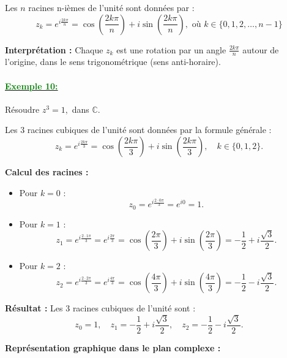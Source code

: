 \documentclass[12pt,a4paper]{article}
\begin{document}
Les \(n\) racines n-ièmes de l’unité sont données par :
\[
z_k = e^{i\frac{2k\pi}{n}} = \cos\left(\frac{2k\pi}{n}\right) + i\sin\left(\frac{2k\pi}{n}\right), \text{ où } k \in \{0, 1, 2, \ldots, n-1\}
\]

\textbf{Interprétation :} Chaque \(z_k\) est une rotation par un angle \(\frac{2k\pi}{n}\) autour de l’origine, dans le sens trigonométrique (sens anti-horaire). 

\paragraph{\underline{\textbf{\textcolor{green}{Exemple 10: }}}}

Résoudre \( z^3 = 1, \) dans \( \mathbb{C} \).

Les \(3\) racines cubiques de l’unité sont données par la formule générale :
\[
z_k = e^{i\frac{2k\pi}{3}} = \cos\left(\frac{2k\pi}{3}\right) + i\sin\left(\frac{2k\pi}{3}\right), \quad k \in \{0, 1, 2\}.
\]

\textbf{Calcul des racines :}
\begin{itemize}
    \item Pour \(k = 0\) : 
    \[
    z_0 = e^{i\frac{2\cdot 0\pi}{3}} = e^{i0} = 1.
    \]
    \item Pour \(k = 1\) : 
    \[
    z_1 = e^{i\frac{2\cdot 1\pi}{3}} = e^{i\frac{2\pi}{3}} = \cos\left(\frac{2\pi}{3}\right) + i\sin\left(\frac{2\pi}{3}\right) = -\frac{1}{2} + i\frac{\sqrt{3}}{2}.
    \]
    \item Pour \(k = 2\) : 
    \[
    z_2 = e^{i\frac{2\cdot 2\pi}{3}} = e^{i\frac{4\pi}{3}} = \cos\left(\frac{4\pi}{3}\right) + i\sin\left(\frac{4\pi}{3}\right) = -\frac{1}{2} - i\frac{\sqrt{3}}{2}.
    \]
\end{itemize}

\textbf{Résultat :} Les \(3\) racines cubiques de l’unité sont :
\[
z_0 = 1, \quad z_1 = -\frac{1}{2} + i\frac{\sqrt{3}}{2}, \quad z_2 = -\frac{1}{2} - i\frac{\sqrt{3}}{2}.
\]

\textbf{Représentation graphique dans le plan complexe :}

\begin{center}
\end{center}
\end{document}

